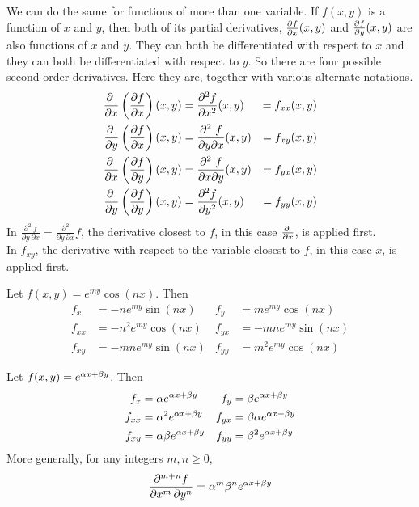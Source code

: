 We can do the same for functions of more than one variable. 
If $f(x,y)$ is a function of $x$ and $y$, then both of its partial
derivatives, $\pdiff{f}{x}(x,y)$ and $\pdiff{f}{y}(x,y)$
are also functions of $x$ and $y$. They can both be differentiated with 
respect to $x$ and they can both be differentiated with respect to $y$. So 
there are four possible second order derivatives. Here they are, together
with various alternate notations.
\begin{alignat*}{5}
\pdiff{}{x}\left(\pdiff{f}{x}\right)(x,y)
   &=\frac{\partial^2 f}{\partial x^2}(x,y) &= f_{xx}(x,y) \\
\pdiff{}{y}\left(\pdiff{f}{x}\right)(x,y)
   &=\frac{\partial^2\ f}{\partial y\partial x}(x,y) &= f_{xy}(x,y) \\
\pdiff{}{x}\left(\pdiff{f}{y}\right)(x,y)
   &=\frac{\partial^2\ f}{\partial x\partial y}(x,y) &= f_{yx}(x,y) \\
\pdiff{}{y}\left(\pdiff{f}{y}\right)(x,y)
   &=\frac{\partial^2 f}{\partial y^2}(x,y) &= f_{yy}(x,y) 
\end{alignat*}
In $\frac{\partial^2\ f}{\partial y\,\partial x}
=\frac{\partial^2}{\partial y\,\partial x}f$, the derivative closest
to $f$, in this case $\pdiff{}{x}$, is applied first.\\
In $f_{xy}$, the derivative with respect to the variable closest
to $f$, in this case $x$, is applied first.
\begin{eg}\label{eg higher order A}
Let $f(x,y) = e^{my}\cos(nx)$. Then
\begin{align*}
f_x &=  -n e^{my}\sin(nx) &
f_y &=   m e^{my}\cos(nx) \\
f_{xx}  &=   -n^2 e^{my}\cos(nx) &
f_{yx} &=   -m n e^{my}\sin(nx) \\
f_{xy}  &=   -m n e^{my}\sin(nx) &
f_{yy} &=   m^2 e^{my}\cos(nx) 
\end{align*}
\end{eg}


\begin{eg}\label{eg higher order B}
Let $f(x,y) = e^{\alpha x+\beta y}$. Then
\begin{align*}
f_x &=  \alpha e^{\alpha x+\beta y} &
f_y &=  \beta e^{\alpha x+\beta y} \\
f_{xx}  &= \alpha^2  e^{\alpha x+\beta y} &
f_{yx} &=   \beta \alpha e^{\alpha x+\beta y} \\
f_{xy}  &=  \alpha \beta  e^{\alpha x+\beta y} &
f_{yy} &=  \beta^2 e^{\alpha x+\beta y}
\end{align*}
More generally, for any integers $m,n\ge 0$,
\begin{equation*}
\frac{\partial^{m+n} f}{\partial x^m\, \partial y^n} 
     = \alpha^m\beta^n e^{\alpha x+\beta y}
\end{equation*}
\end{eg}

